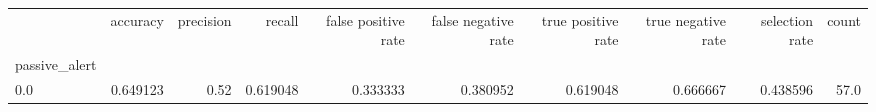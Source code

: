 \begin{tabular}{lrrrrrrrrr}
\toprule
{} &  accuracy &  precision &    recall &  false positive rate &  false negative rate &  true positive rate &  true negative rate &  selection rate &  count \\
passive\_alert &           &            &           &                      &                      &                     &                     &                 &        \\
\midrule
0.0           &  0.649123 &       0.52 &  0.619048 &             0.333333 &             0.380952 &            0.619048 &            0.666667 &        0.438596 &   57.0 \\
\bottomrule
\end{tabular}
